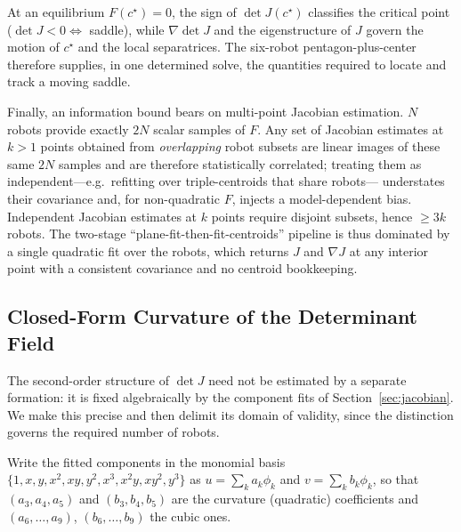 \documentclass[journal]{IEEEtran}
\begin{document}
At an equilibrium $F(c^{\star})=0$, the sign of $\det J(c^{\star})$ classifies the
critical point ($\det J<0\Leftrightarrow$ saddle), while $\nabla\!\det J$ and the
eigenstructure of $J$ govern the motion of $c^{\star}$ and the local separatrices.
The six-robot pentagon-plus-center therefore supplies, in one determined solve,
the quantities required to locate and track a moving saddle.

Finally, an information bound bears on multi-point Jacobian estimation. $N$ robots
provide exactly $2N$ scalar samples of $F$. Any set of Jacobian estimates at
$k>1$ points obtained from \emph{overlapping} robot subsets are linear images of
these same $2N$ samples and are therefore statistically correlated; treating them
as independent---e.g.\ refitting over triple-centroids that share robots---
understates their covariance and, for non-quadratic $F$, injects a
model-dependent bias. Independent Jacobian estimates at $k$ points require
disjoint subsets, hence $\ge 3k$ robots. The two-stage
``plane-fit-then-fit-centroids'' pipeline is thus dominated by a single quadratic
fit over the robots, which returns $J$ and $\nabla J$ at any interior point with a
consistent covariance and no centroid bookkeeping.

\subsection{Closed-Form Curvature of the Determinant Field}
\label{sec:detcurv}

The second-order structure of $\det J$ need not be estimated by a separate
formation: it is fixed algebraically by the component fits of
Section~\ref{sec:jacobian}. We make this precise and then delimit its domain of
validity, since the distinction governs the required number of robots.

Write the fitted components in the monomial basis
$\{1,x,y,x^{2},xy,y^{2},x^{3},x^{2}y,xy^{2},y^{3}\}$ as $u=\sum_{k}a_{k}\phi_{k}$
and $v=\sum_{k}b_{k}\phi_{k}$, so that $(a_{3},a_{4},a_{5})$ and
$(b_{3},b_{4},b_{5})$ are the curvature (quadratic) coefficients and
$(a_{6},\dots,a_{9})$, $(b_{6},\dots,b_{9})$ the cubic ones.
\end{document}
